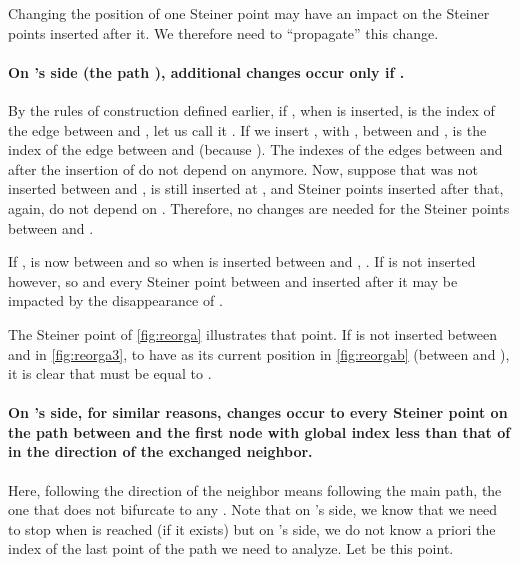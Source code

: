 \documentclass{article}
\theoremstyle{plain}
\begin{document}
Changing the position of one Steiner point may have an impact on the Steiner points inserted after it.
We therefore need to ``propagate'' this change. 
\paragraph{On 's side (the path ), additional changes occur only if .}  
By the rules of construction defined earlier, if , when  is inserted,  is the index of the edge between  and , let us call it . 
If we insert , with , between  and ,  is the index of the edge between  and  (because ). 
The indexes of the edges between  and  after the insertion of  do not depend on  anymore. 
Now, suppose that  was not inserted between  and ,  is still inserted at , and Steiner points inserted after that, again, do not depend on . 
Therefore, no changes are needed for the Steiner points between  and .

If ,  is now between  and  so when  is inserted between  and , . If  is not inserted however,  so  and every Steiner point between  and  inserted after it may be impacted by the disappearance of .

The Steiner point  of \cref{fig:reorga} illustrates that point. 
If  is not inserted between  and  in \cref{fig:reorga3}, to have  as its current position in \cref{fig:reorgab} (between  and ), it is clear that  must be equal to .

\paragraph{On 's side, for similar reasons, changes occur to every Steiner point on the path between  and the first node with global index less than that of  in the direction of the exchanged neighbor.}
Here, following the direction of the neighbor means following the main path, the one that does not bifurcate to any . 
Note that on 's side, we know that we need to stop when  is reached (if it exists) but on 's side, we do not know a priori the index of the last point of the path we need to analyze. Let  be this point.
\end{document}
